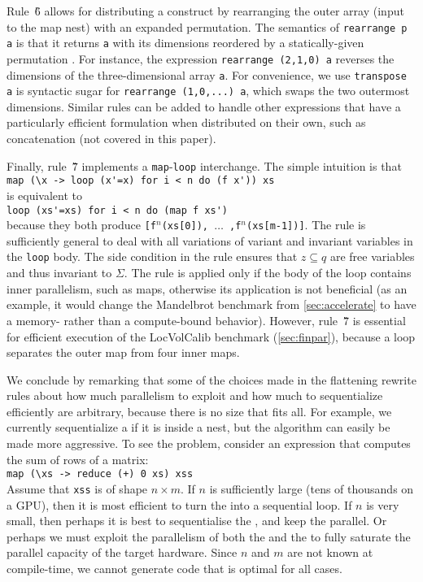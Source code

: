Rule~\G{6} allows for distributing a  construct by
rearranging the outer array (input to the map nest) with an expanded
permutation.  The semantics of \lstinline{rearrange p a} is that it
returns \lstinline{a} with its dimensions reordered by a
statically-given permutation . For instance, the expression
\mbox{\lstinline{rearrange (2,1,0) a}} reverses the dimensions of the
three-dimensional array \lstinline{a}.
%
For convenience, we use \mbox{\lstinline{transpose a}} is syntactic
sugar for \mbox{\lstinline{rearrange (1,0,...) a}}, which swaps the two
  outermost dimensions.
%
Similar rules can be added to handle other expressions
that have a particularly efficient formulation when distributed on
their own, such as concatenation (not covered in this paper).

Finally, rule~\G{7} implements a \lstinline{map}-\lstinline{loop}
interchange.  The
simple intuition is that\\
\hspace*{0.5cm}\lstinline!map (\x -> loop (x'=x) for i < n do (f x')) xs!\\
is equivalent to\\
\hspace*{0.5cm}\lstinline!loop (xs'=xs) for i < n do (map f xs')!\\
because they both produce \texttt{[f$^n$(xs[0]), $\ldots$
  ,f$^n$(xs[m-1])]}.  The rule is sufficiently general to deal with
all variations of variant and invariant variables in the
\lstinline{loop} body.  The side condition in the rule ensures that
$z \subseteq q$ are free variables and thus invariant to $\Sigma$.
The rule is applied only if the body of the loop contains inner
parallelism, such as maps, otherwise its application is not beneficial
(as an example, it would change the Mandelbrot benchmark from
\cref{sec:accelerate} to have a memory- rather than a compute-bound
behavior).
%
However, rule~\G{7} is essential for efficient execution of the
LocVolCalib benchmark (\cref{sec:finpar}), because a loop separates
the outer map from four inner maps.

We conclude by remarking that some of the choices made in the
flattening rewrite rules about how much parallelism to exploit and how
much to sequentialize efficiently are arbitrary, because there is no
size that fits all.  For example, we currently sequentialize a
\StreamPar{} if it is inside a \Map{} nest, but the algorithm can
easily be made more aggressive.  To see the problem, consider an
expression that computes the sum of rows of a matrix:\\
\hspace*{0.5cm}\lstinline{map (\xs -> reduce (+) 0 xs) xss}\\
Assume that \lstinline{xss} is of shape $n\times{}m$.  If $n$ is
sufficiently large (tens of thousands on a GPU), then it is most
efficient to turn the  into a sequential loop.  If $n$ is
very small, then perhaps it is best to sequentialise the , and
keep the  parallel.  Or perhaps we must exploit the
parallelism of both the  and the  to fully saturate
the parallel capacity of the target hardware.  Since $n$ and $m$ are
not known at compile-time, we cannot generate code that is optimal for
all cases.

